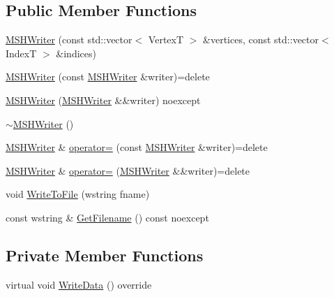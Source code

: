 \subsection*{Public Member Functions}
\begin{DoxyCompactItemize}
\item 
\mbox{\hyperlink{classmage_1_1rendering_1_1loader_1_1_m_s_h_writer_a5e1a7ed8ca94f157f52bba929cac2fd3}{M\+S\+H\+Writer}} (const std\+::vector$<$ VertexT $>$ \&vertices, const std\+::vector$<$ IndexT $>$ \&indices)
\item 
\mbox{\hyperlink{classmage_1_1rendering_1_1loader_1_1_m_s_h_writer_ade94bfa4dc8b4bdc2249cd882f2240e4}{M\+S\+H\+Writer}} (const \mbox{\hyperlink{classmage_1_1rendering_1_1loader_1_1_m_s_h_writer}{M\+S\+H\+Writer}} \&writer)=delete
\item 
\mbox{\hyperlink{classmage_1_1rendering_1_1loader_1_1_m_s_h_writer_a877a042ef1a4472c9d1cece846b2a70a}{M\+S\+H\+Writer}} (\mbox{\hyperlink{classmage_1_1rendering_1_1loader_1_1_m_s_h_writer}{M\+S\+H\+Writer}} \&\&writer) noexcept
\item 
\mbox{\hyperlink{classmage_1_1rendering_1_1loader_1_1_m_s_h_writer_ae2ead8892a1818c59d55a7a5ecdf50b3}{$\sim$\+M\+S\+H\+Writer}} ()
\item 
\mbox{\hyperlink{classmage_1_1rendering_1_1loader_1_1_m_s_h_writer}{M\+S\+H\+Writer}} \& \mbox{\hyperlink{classmage_1_1rendering_1_1loader_1_1_m_s_h_writer_a661eaab96539a7bf08f100095603af0e}{operator=}} (const \mbox{\hyperlink{classmage_1_1rendering_1_1loader_1_1_m_s_h_writer}{M\+S\+H\+Writer}} \&writer)=delete
\item 
\mbox{\hyperlink{classmage_1_1rendering_1_1loader_1_1_m_s_h_writer}{M\+S\+H\+Writer}} \& \mbox{\hyperlink{classmage_1_1rendering_1_1loader_1_1_m_s_h_writer_a98bdde59fa1a7a6398453f0c7bc4e8dd}{operator=}} (\mbox{\hyperlink{classmage_1_1rendering_1_1loader_1_1_m_s_h_writer}{M\+S\+H\+Writer}} \&\&writer)=delete
\item 
void \mbox{\hyperlink{classmage_1_1rendering_1_1loader_1_1_m_s_h_writer_a3a49f78f308a0827f4a99150ad49d7c1}{Write\+To\+File}} (wstring fname)
\item 
const wstring \& \mbox{\hyperlink{classmage_1_1rendering_1_1loader_1_1_m_s_h_writer_a61a80be19c7b59ff5803e51401e8f646}{Get\+Filename}} () const noexcept
\end{DoxyCompactItemize}
\subsection*{Private Member Functions}
\begin{DoxyCompactItemize}
\item 
virtual void \mbox{\hyperlink{classmage_1_1rendering_1_1loader_1_1_m_s_h_writer_ad61ee7097e1bfb52ca9a0697d2cd6a7e}{Write\+Data}} () override
\end{DoxyCompactItemize}
